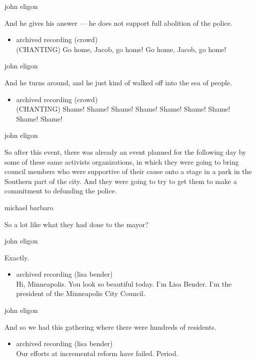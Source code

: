 john eligon

And he gives his answer --- he does not support full abolition of the
police.

\begin{itemize}
\tightlist
\item
  archived recording (crowd)\\
  (CHANTING) Go home, Jacob, go home! Go home, Jacob, go home!
\end{itemize}

john eligon

And he turns around, and he just kind of walked off into the sea of
people.

\begin{itemize}
\tightlist
\item
  archived recording (crowd)\\
  (CHANTING) Shame! Shame! Shame! Shame! Shame! Shame! Shame! Shame!
  Shame!
\end{itemize}

john eligon

So after this event, there was already an event planned for the
following day by some of these same activists organizations, in which
they were going to bring council members who were supportive of their
cause onto a stage in a park in the Southern part of the city. And they
were going to try to get them to make a commitment to defunding the
police.

michael barbaro

So a lot like what they had done to the mayor?

john eligon

Exactly.

\begin{itemize}
\tightlist
\item
  archived recording (lisa bender)\\
  Hi, Minneapolis. You look so beautiful today. I'm Lisa Bender. I'm the
  president of the Minneapolis City Council.
\end{itemize}

john eligon

And so we had this gathering where there were hundreds of residents.

\begin{itemize}
\tightlist
\item
  archived recording (lisa bender)\\
  Our efforts at incremental reform have failed. Period.
\end{itemize}

